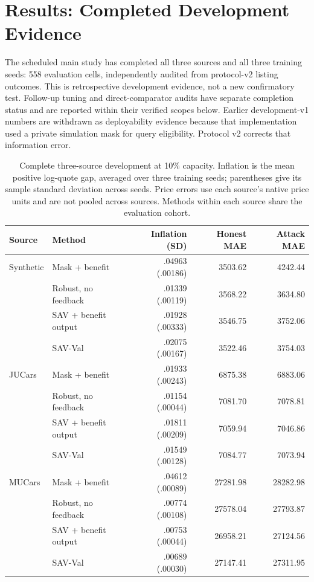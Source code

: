 \section{Results: Completed Development Evidence}
The scheduled main study has completed all three sources and all three
training seeds: 558 evaluation cells, independently audited from
protocol-v2 listing outcomes. This is retrospective development evidence,
not a new confirmatory test. Follow-up tuning and direct-comparator
audits have separate completion status and are reported within their
verified scopes below.
Earlier development-v1 numbers are withdrawn as deployability evidence
because that implementation used a private simulation mask for query
eligibility. Protocol v2 corrects that information error.

\begin{table}[t]
\centering
\caption{Complete three-source development at 10\% capacity. Inflation is
the mean positive log-quote gap, averaged over three training seeds;
parentheses give its sample standard deviation across seeds. Price errors
use each source's native price units and are not pooled across sources.
Methods within each source share the evaluation cohort.}
\label{tab:synthetic_development}
\begin{tabular}{llrrr}
\toprule
Source & Method & Inflation (SD) & Honest MAE & Attack MAE\\
\midrule
Synthetic & Mask + benefit & .04963 (.00186) & 3503.62 & 4242.44\\
 & Robust, no feedback & .01339 (.00119) & 3568.22 & 3634.80\\
 & SAV + benefit output & .01928 (.00333) & 3546.75 & 3752.06\\
 & SAV-Val & .02075 (.00167) & 3522.46 & 3754.03\\
\midrule
JUCars & Mask + benefit & .01933 (.00243) & 6875.38 & 6883.06\\
 & Robust, no feedback & .01154 (.00044) & 7081.70 & 7078.81\\
 & SAV + benefit output & .01811 (.00209) & 7059.94 & 7046.86\\
 & SAV-Val & .01549 (.00128) & 7084.77 & 7073.94\\
\midrule
MUCars & Mask + benefit & .04612 (.00089) & 27281.98 & 28282.98\\
 & Robust, no feedback & .00774 (.00108) & 27578.04 & 27793.87\\
 & SAV + benefit output & .00753 (.00044) & 26958.21 & 27124.56\\
 & SAV-Val & .00689 (.00030) & 27147.41 & 27311.95\\
\bottomrule
\end{tabular}
\end{table}

